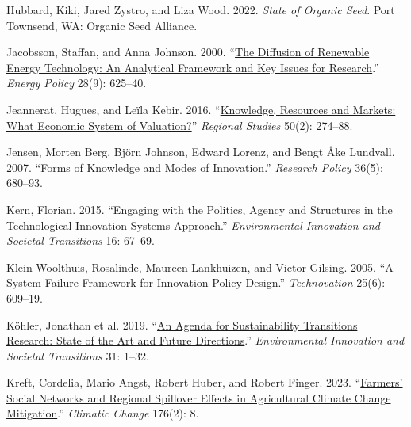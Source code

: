 \documentclass[twoside,12pt,final]{ucthesis-CA2012}
\newlength{\cslhangindent}
\newenvironment{CSLReferences}[2] %
 {%
  \setlength{\parindent}{0pt}
  \ifodd #1 \everypar{\setlength{\hangindent}{\cslhangindent}}\ignorespaces\fi
  \ifnum #2 > 0
  \setlength{\parskip}{#2\baselineskip}
  \fi
 }%
 {}
\begin{document}
\begin{ucmainmatter}
\begin{CSLReferences}{1}{0}
\leavevmode{}%
Hubbard, Kiki, Jared Zystro, and Liza Wood. 2022. \emph{State of Organic Seed}. Port Townsend, WA: Organic Seed Alliance.

\leavevmode{}%
Jacobsson, Staffan, and Anna Johnson. 2000. {``\href{https://doi.org/10.1016/S0301-4215(00)00041-0}{The Diffusion of Renewable Energy Technology: An Analytical Framework and Key Issues for Research}.''} \emph{Energy Policy} 28(9): 625--40.

\leavevmode{}%
Jeannerat, Hugues, and Leïla Kebir. 2016. {``\href{https://doi.org/10.1080/00343404.2014.986718}{Knowledge, Resources and Markets: What Economic System of Valuation?}''} \emph{Regional Studies} 50(2): 274--88.

\leavevmode{}%
Jensen, Morten Berg, Björn Johnson, Edward Lorenz, and Bengt Åke Lundvall. 2007. {``\href{https://doi.org/10.1016/j.respol.2007.01.006}{Forms of Knowledge and Modes of Innovation}.''} \emph{Research Policy} 36(5): 680--93.

\leavevmode{}%
Kern, Florian. 2015. {``\href{https://doi.org/10.1016/j.eist.2015.07.001}{Engaging with the Politics, Agency and Structures in the Technological Innovation Systems Approach}.''} \emph{Environmental Innovation and Societal Transitions} 16: 67--69.

\leavevmode{}%
Klein Woolthuis, Rosalinde, Maureen Lankhuizen, and Victor Gilsing. 2005. {``\href{https://doi.org/10.1016/j.technovation.2003.11.002}{A System Failure Framework for Innovation Policy Design}.''} \emph{Technovation} 25(6): 609--19.

\leavevmode{}%
Köhler, Jonathan et al. 2019. {``\href{https://doi.org/10.1016/J.EIST.2019.01.004}{An Agenda for Sustainability Transitions Research: State of the Art and Future Directions}.''} \emph{Environmental Innovation and Societal Transitions} 31: 1--32.

\leavevmode{}%
Kreft, Cordelia, Mario Angst, Robert Huber, and Robert Finger. 2023. {``\href{https://doi.org/10.1007/s10584-023-03484-6}{Farmers' Social Networks and Regional Spillover Effects in Agricultural Climate Change Mitigation}.''} \emph{Climatic Change} 176(2): 8.


\end{CSLReferences}
\end{ucmainmatter}
\end{document}
